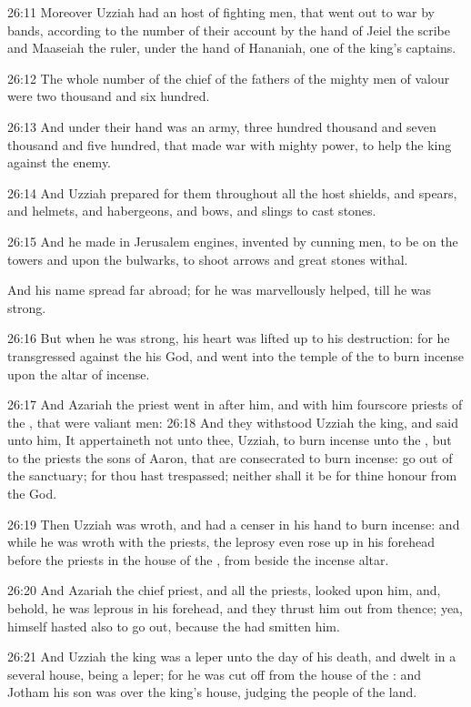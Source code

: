 26:11 Moreover Uzziah had an host of fighting men, that went out to
war by bands, according to the number of their account by the hand of
Jeiel the scribe and Maaseiah the ruler, under the hand of Hananiah,
one of the king's captains.

26:12 The whole number of the chief of the fathers of the mighty men
of valour were two thousand and six hundred.

26:13 And under their hand was an army, three hundred thousand and
seven thousand and five hundred, that made war with mighty power, to
help the king against the enemy.

26:14 And Uzziah prepared for them throughout all the host shields,
and spears, and helmets, and habergeons, and bows, and slings to cast
stones.

26:15 And he made in Jerusalem engines, invented by cunning men, to be
on the towers and upon the bulwarks, to shoot arrows and great stones
withal.

And his name spread far abroad; for he was marvellously helped, till
he was strong.

26:16 But when he was strong, his heart was lifted up to his
destruction: for he transgressed against the \LORD his God, and went
into the temple of the \LORD to burn incense upon the altar of incense.

26:17 And Azariah the priest went in after him, and with him fourscore
priests of the \LORD, that were valiant men: 26:18 And they withstood
Uzziah the king, and said unto him, It appertaineth not unto thee,
Uzziah, to burn incense unto the \LORD, but to the priests the sons of
Aaron, that are consecrated to burn incense: go out of the sanctuary;
for thou hast trespassed; neither shall it be for thine honour from
the \LORD God.

26:19 Then Uzziah was wroth, and had a censer in his hand to burn
incense: and while he was wroth with the priests, the leprosy even
rose up in his forehead before the priests in the house of the \LORD,
from beside the incense altar.

26:20 And Azariah the chief priest, and all the priests, looked upon
him, and, behold, he was leprous in his forehead, and they thrust him
out from thence; yea, himself hasted also to go out, because the \LORD
had smitten him.

26:21 And Uzziah the king was a leper unto the day of his death, and
dwelt in a several house, being a leper; for he was cut off from the
house of the \LORD: and Jotham his son was over the king's house,
judging the people of the land.

